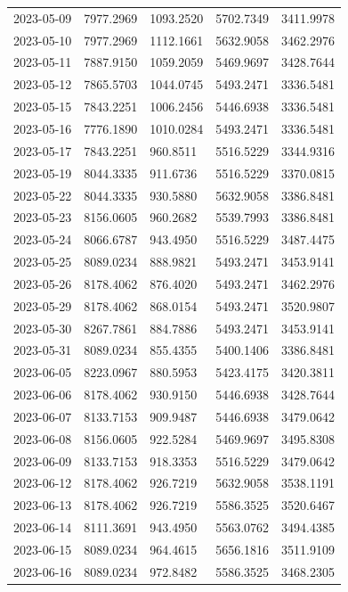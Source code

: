 \begin{footnotesize}
\begin{longtable}{lllll}
2023-05-09 & 7977.2969 & 1093.2520 & 5702.7349 & 3411.9978 \\
2023-05-10 & 7977.2969 & 1112.1661 & 5632.9058 & 3462.2976 \\
2023-05-11 & 7887.9150 & 1059.2059 & 5469.9697 & 3428.7644 \\
2023-05-12 & 7865.5703 & 1044.0745 & 5493.2471 & 3336.5481 \\
2023-05-15 & 7843.2251 & 1006.2456 & 5446.6938 & 3336.5481 \\
2023-05-16 & 7776.1890 & 1010.0284 & 5493.2471 & 3336.5481 \\
2023-05-17 & 7843.2251 & 960.8511 & 5516.5229 & 3344.9316 \\
2023-05-19 & 8044.3335 & 911.6736 & 5516.5229 & 3370.0815 \\
2023-05-22 & 8044.3335 & 930.5880 & 5632.9058 & 3386.8481 \\
2023-05-23 & 8156.0605 & 960.2682 & 5539.7993 & 3386.8481 \\
2023-05-24 & 8066.6787 & 943.4950 & 5516.5229 & 3487.4475 \\
2023-05-25 & 8089.0234 & 888.9821 & 5493.2471 & 3453.9141 \\
2023-05-26 & 8178.4062 & 876.4020 & 5493.2471 & 3462.2976 \\
2023-05-29 & 8178.4062 & 868.0154 & 5493.2471 & 3520.9807 \\
2023-05-30 & 8267.7861 & 884.7886 & 5493.2471 & 3453.9141 \\
2023-05-31 & 8089.0234 & 855.4355 & 5400.1406 & 3386.8481 \\
2023-06-05 & 8223.0967 & 880.5953 & 5423.4175 & 3420.3811 \\
2023-06-06 & 8178.4062 & 930.9150 & 5446.6938 & 3428.7644 \\
2023-06-07 & 8133.7153 & 909.9487 & 5446.6938 & 3479.0642 \\
2023-06-08 & 8156.0605 & 922.5284 & 5469.9697 & 3495.8308 \\
2023-06-09 & 8133.7153 & 918.3353 & 5516.5229 & 3479.0642 \\
2023-06-12 & 8178.4062 & 926.7219 & 5632.9058 & 3538.1191 \\
2023-06-13 & 8178.4062 & 926.7219 & 5586.3525 & 3520.6467 \\
2023-06-14 & 8111.3691 & 943.4950 & 5563.0762 & 3494.4385 \\
2023-06-15 & 8089.0234 & 964.4615 & 5656.1816 & 3511.9109 \\
2023-06-16 & 8089.0234 & 972.8482 & 5586.3525 & 3468.2305 \\

\end{longtable}
\end{footnotesize}
